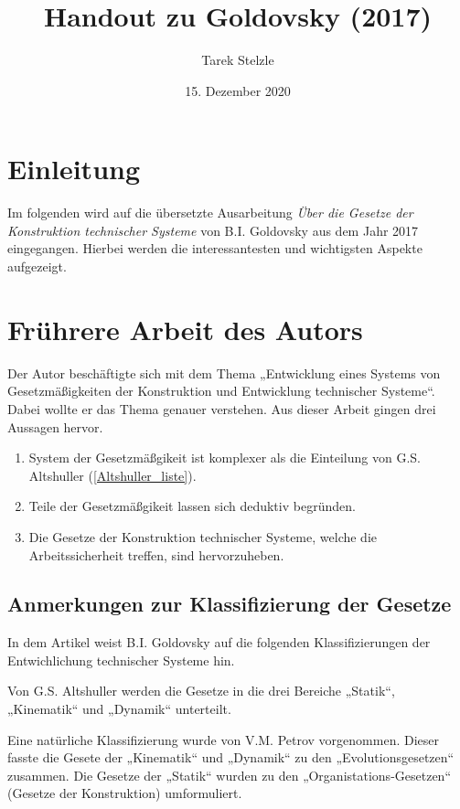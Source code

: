 \documentclass[11pt,a4paper]{article}
\title{Handout zu Goldovsky (2017)}
\author{Tarek Stelzle}
\date{15. Dezember 2020}
\begin{document}
\maketitle

\section{Einleitung}
Im folgenden wird auf die übersetzte Ausarbeitung \emph{Über die Gesetze der
  Konstruktion technischer Systeme} von B.I. Goldovsky aus dem Jahr 2017
eingegangen.  Hierbei werden die interessantesten und wichtigsten Aspekte
aufgezeigt.

\section{Frührere Arbeit des Autors}
Der Autor beschäftigte sich mit dem Thema „Entwicklung eines Systems von
Gesetzmäßig\-keiten der Konstruktion und Entwicklung technischer Systeme“.
Dabei wollte er das Thema genauer verstehen.  Aus dieser Arbeit gingen drei
Aussagen hervor.

\begin{enumerate}[noitemsep]
\item System der Gesetzmäßgikeit ist komplexer als die Einteilung von
  G.S. Altshuller (\ref{Altshuller_liste}).
\item Teile der Gesetzmäßgikeit lassen sich deduktiv begründen.
\item Die Gesetze der Konstruktion technischer Systeme, welche die
  Arbeitssicherheit treffen, sind hervorzuheben.
\end{enumerate}

\subsection{Anmerkungen zur Klassifizierung der Gesetze}
In dem Artikel weist B.I. Goldovsky auf die folgenden Klassifizierungen der
Entwichlichung technischer Systeme hin.

Von G.S. Altshuller \label{Altshuller_liste} werden die Gesetze in die drei
Bereiche „Statik“, „Kinematik“ und „Dynamik“ unterteilt.

Eine natürliche Klassifizierung wurde von V.M. Petrov vorgenommen.  Dieser
fasste die Gesete der „Kinematik“ und „Dynamik“ zu den „Evolutionsgesetzen“
zusammen.  Die Gesetze der „Statik“ wurden zu den „Organistations-Gesetzen“
(Gesetze der Konstruktion) umformuliert.
\end{document}
